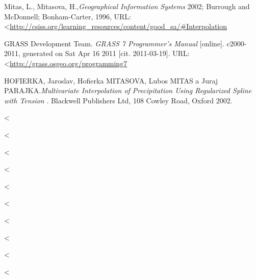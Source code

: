 \documentclass[a4paper,12pt]{report}
\begin{document}
\begin{thebibliography}{99}
Mitas, L., Mitasova, H.,\textit{Geographical Information Systems}
2002; Burrough and McDonnell; Bonham-Carter, 1996, URL: \textless\url {http://csiss.org/learning_resources/content/good_sa/#Interpolation}


GRASS Development Team.\textit{ GRASS 7 Programmer’s Manual}
[online]. c2000-2011, generated on Sat Apr 16 2011 [cit. 2011-03-19]. URL:\textless\url {http://grass.osgeo.org/programming7  }

HOFIERKA, Jaroslav, Hofierka MITASOVA, Lubos MITAS a Juraj PARAJKA.\textit{Multivariate Interpolation of Precipitation Using Regularized Spline with Tension }. Blackwell Publishers Ltd, 108 Cowley Road, Oxford 2002. 



\bibitem{ }
\textit{ }
\textless\url {  }

\bibitem{ }
\textit{ }
\textless\url {  }

\bibitem{ }
\textit{ }
\textless\url {  }

\bibitem{ }
\textit{ }
\textless\url {  }

\bibitem{ }
\textit{ }
\textless\url {  }

\bibitem{ }
\textit{ }
\textless\url {  }

\bibitem{ }
\textit{ }
\textless\url {  }

\bibitem{ }
\textit{ }
\textless\url {  }

\bibitem{ }
\textit{ }
\textless\url {  }


\bibitem{ }
\textit{ }
\textless\url {  }





\end{thebibliography}
\end{document}
